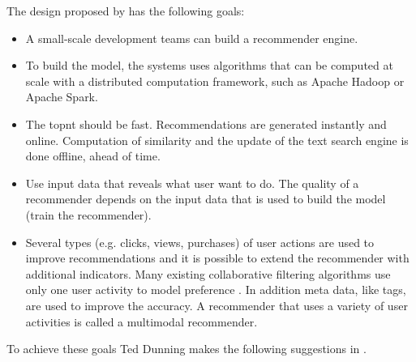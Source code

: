 The design proposed by \cite{Dunning14} has the following goals:
\begin{itemize}
\item A small-scale development teams can build a recommender engine.
\item To build the model, the systems uses algorithms that can be computed at scale with a distributed computation framework, such as Apache Hadoop or Apache Spark. 
\item The \gls{topnt} should be fast. Recommendations are generated instantly and online. Computation of similarity and the update of the text search engine is done offline, ahead of time.
\item Use input data that reveals what user want to do. The quality of a recommender depends on the input data that is used to build the model (train the recommender). 
\item Several types (e.g. clicks, views, purchases) of user actions are used to improve recommendations and it is possible to extend the recommender with additional \glspl{indicator}. Many existing collaborative filtering algorithms use only one user activity to model preference \cite{ferrel}. In addition meta data, like \glspl{tag}, are used to improve the accuracy. A recommender that uses a variety of user activities is called a \gls{multimodal} recommender. 
\end{itemize}

To achieve these goals Ted Dunning makes the following suggestions in \cite{Dunning14}.

